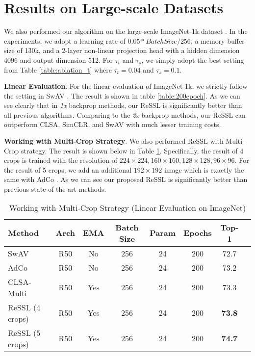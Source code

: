 \documentclass{article}
\newcommand{\<}{\left\langle}
\renewcommand{\>}{\right\rangle}
\begin{document}
\section{Results on Large-scale Datasets}
We also performed our algorithm on the large-scale ImageNet-1k dataset \cite{imagenet_cvpr09}. In the experiments, we adopt a learning rate of $0.05 * BatchSize / 256$, a memory buffer size of 130k, and a 2-layer non-linear projection head with a hidden dimension 4096 and output dimension 512. For $\tau_t$ and $\tau_s$, we simply adopt the best setting from Table \ref{table:ablation_t} where $\tau_t = 0.04$ and $\tau_s = 0.1$.

\textbf{Linear Evaluation}.
For the linear evaluation of ImageNet-1k, we strictly follow the setting in SwAV \cite{swav}. The result is shown in table \ref{table:200epoch}. As we can see clearly that in \emph{1x} backprop methods, our ReSSL is significantly better than all previous algorithms. Comparing to the \emph{2x} backprop methods, our ReSSL can outperform CLSA, SimCLR, and SwAV with much lesser training costs.

\textbf{Working with Multi-Crop Strategy}.
We also performed ReSSL with Multi-Crop strategy. The result is shown below in Table \ref{table:multi_crop}. Specifically, the result of 4 crops is trained with the resolution of $224 \times 224, 160 \times 160, 128 \times 128, 96 \times 96 $. For the result of 5 crops, we add an additional $192 \times 192$ image which is exactly the same with AdCo \cite{adco}. As we can see our proposed ReSSL is significantly better than previous state-of-the-art methods.

\begin{table}[h]
 \centering
 \small
 \caption{Working with Multi-Crop Strategy (Linear Evaluation on ImageNet)}
 \label{table:multi_crop}
 \vspace{-5pt}
\begin{tabular}{l  c c c c c c c} 
\toprule 
Method & Arch  & EMA & Batch Size & Param & Epochs & Top-1 \\
\hline
SwAV \cite{swav}                   & R50 & No & 256   & 24 & 200 & 72.7 \\
AdCo \cite{adco}                   & R50 & No & 256   & 24 & 200 & 73.2 \\
CLSA-Multi \cite{stronger}               & R50 & Yes & 256  & 24 & 200 & 73.3 \\
ReSSL (4 crops)                    & R50 & Yes & 256  & 24 & 200 & \textbf{73.8} \\
ReSSL (5 crops)                    & R50 & Yes & 256  & 24 & 200 & \textbf{74.7} \\
\toprule
\end{tabular}
\end{table}
\end{document}
